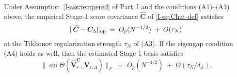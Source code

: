 \documentclass[review,hidelinks,onefignum,onetabnum]{siamart251216}
\newcommand{\mC}{\bm{C}}
\newcommand{\hmC}{\widehat{\bm{C}}}
\newcommand{\mV}{\bm{V}}
\newcommand{\hmV}{\widehat{\bm{V}}}
\begin{document}
\begin{lemma}
\label{lem:score-cov-rate}
Under Assumption~\ref{I-ass:tempered} of Part~I and the conditions \textup{(A1)}--\textup{(A3)} above, the empirical Stage-1 score covariance $\hmC$ of \eqref{I-eq:Chat-def} satisfies
\begin{equation}
  \|\hmC - \mC_\Lambda\|_{\rm op} \;=\; O_p(N^{-1/2}) \;+\; O(\tau_N)
  \label{eq:opnorm-rate}
\end{equation}
at the Tikhonov regularization strength $\tau_N$ of \textup{(A3)}. If the eigengap condition \textup{(A4)} holds as well, then the estimated Stage-1 basis satisfies
\begin{equation}
  \|\sin\Theta(\hmV_r^{\mC}, \mV_{r,\Lambda})\|_F \;=\; O_p(N^{-1/2}) \;+\; O(\tau_N/\delta_\Lambda).
  \label{eq:sintheta-rate}
\end{equation}
\end{lemma}
\end{document}
